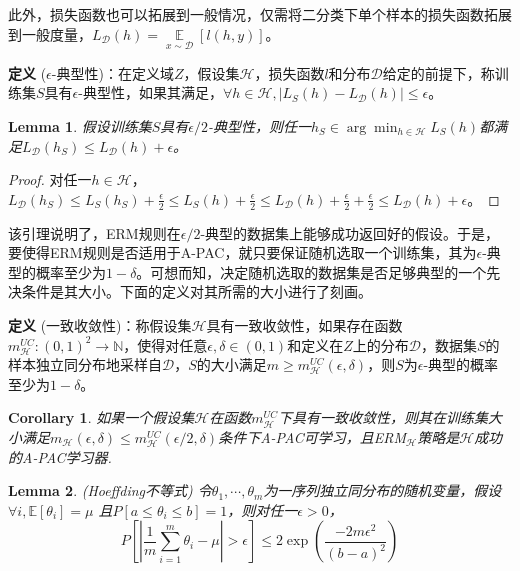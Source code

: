 \documentclass{article}
\newtheorem{corollary}{Corollary}
\newtheorem{lemma}{Lemma}
\newtheorem*{proof}{Proof}
\begin{document}
	此外，损失函数也可以拓展到一般情况，仅需将二分类下单个样本的损失函数拓展到一般度量，$L_\mathcal{D}(h)=\mathop{\mathbb{E}}\limits_{x\sim\mathcal{D}}[l(h,y)]$。
	
\noindent\textbf{定义} ($\epsilon$-典型性)：在定义域$Z$，假设集$\mathcal{H}$，损失函数$l$和分布$\mathcal{D}$给定的前提下，称训练集$S$具有$\epsilon$-典型性，如果其满足，$\forall h\in\mathcal{H},|L_S(h)-L_\mathcal{D}(h)|\leq\epsilon$。
	
	\begin{lemma}
	假设训练集$S$具有$\epsilon/2$-典型性，则任一$h_S\in\arg\min_{h\in\mathcal{H}}L_S(h)$都满足$L_\mathcal{D}(h_S) \leq L_\mathcal{D}(h)+\epsilon$。
	\end{lemma}
	
	\begin{proof}
	对任一$h\in\mathcal{H}$，$L_\mathcal{D}(h_S) \leq L_S(h_S)+\frac{\epsilon}{2} \leq L_S(h)+\frac{\epsilon}{2} \leq L_\mathcal{D}(h)+\frac{\epsilon}{2}+\frac{\epsilon}{2}\leq L_\mathcal{D}(h)+\epsilon$。
	\end{proof}
	
	该引理说明了，ERM规则在$\epsilon/2$-典型的数据集上能够成功返回好的假设。于是，要使得ERM规则是否适用于A-PAC，就只要保证随机选取一个训练集，其为$\epsilon$-典型的概率至少为$1-\delta$。可想而知，决定随机选取的数据集是否足够典型的一个先决条件是其大小。下面的定义对其所需的大小进行了刻画。
	
\noindent\textbf{定义} (一致收敛性)：称假设集$\mathcal{H}$具有一致收敛性，如果存在函数$m^{UC}_\mathcal{H}:(0,1)^2\rightarrow \mathbb{N}$，使得对任意$\epsilon,\delta \in (0, 1)$和定义在$Z$上的分布$\mathcal{D}$，数据集$S$的样本独立同分布地采样自$\mathcal{D}$，$S$的大小满足$m\geq m^{UC}_\mathcal{H}(\epsilon, \delta)$，则$S$为$\epsilon$-典型的概率至少为$1-\delta$。

	\begin{corollary}
	如果一个假设集$\mathcal{H}$在函数$m^{UC}_\mathcal{H}$下具有一致收敛性，则其在训练集大小满足$m_\mathcal{H}(\epsilon,\delta)\leq m^{UC}_\mathcal{H}(\epsilon/2,\delta)$条件下A-PAC可学习，且ERM$_\mathcal{H}$策略是$\mathcal{H}$成功的A-PAC学习器.
	\end{corollary}
	
	\begin{lemma}
	(Hoeffding不等式) 令$\theta_1,\cdots,\theta_m$为一序列独立同分布的随机变量，假设$\forall i, \mathbb{E}[\theta_i]=\mu$ 且$P[a\leq\theta_i\leq b]=1$，则对任一$\epsilon>0$，
	\begin{equation*}
	P\left[\left| \frac{1}{m}\sum_{i=1}^m\theta_i - \mu \right| >\epsilon \right] \leq 2 \exp \left( \frac{-2m\epsilon^2 }{(b-a)^2} \right)
	\end{equation*}
	\end{lemma}
\end{document}
